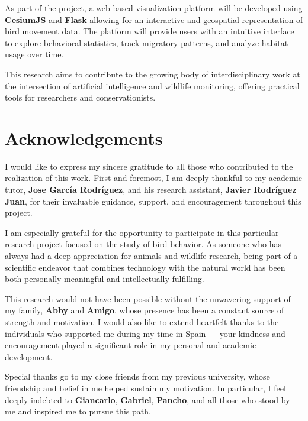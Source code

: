 As part of the project, a web-based visualization platform will be developed using \textbf{CesiumJS} and \textbf{Flask} allowing for an interactive and geospatial representation of bird movement data. The platform will provide users with an intuitive interface to explore behavioral statistics, track migratory patterns, and analyze habitat usage over time.

This research aims to contribute to the growing body of interdisciplinary work at the intersection of artificial intelligence and wildlife monitoring, offering practical tools for researchers and conservationists.


\cleardoublepage %
\chapter*{Acknowledgements}


\thispagestyle{empty}
\vspace{1cm}

I would like to express my sincere gratitude to all those who contributed to the realization of this work. First and foremost, I am deeply thankful to my academic tutor, \textbf{Jose García Rodríguez}, and his research assistant, \textbf{Javier Rodríguez Juan}, for their invaluable guidance, support, and encouragement throughout this project.

I am especially grateful for the opportunity to participate in this particular research project focused on the study of bird behavior. As someone who has always had a deep appreciation for animals and wildlife research, being part of a scientific endeavor that combines technology with the natural world has been both personally meaningful and intellectually fulfilling.

This research would not have been possible without the unwavering support of my family, \textbf{Abby} and \textbf{Amigo}, whose presence has been a constant source of strength and motivation. I would also like to extend heartfelt thanks to the individuals who supported me during my time in Spain — your kindness and encouragement played a significant role in my personal and academic development.

Special thanks go to my close friends from my previous university, whose friendship and belief in me helped sustain my motivation. In particular, I feel deeply indebted to \textbf{Giancarlo}, \textbf{Gabriel}, \textbf{Pancho}, and all those who stood by me and inspired me to pursue this path.


\cleardoublepage %

